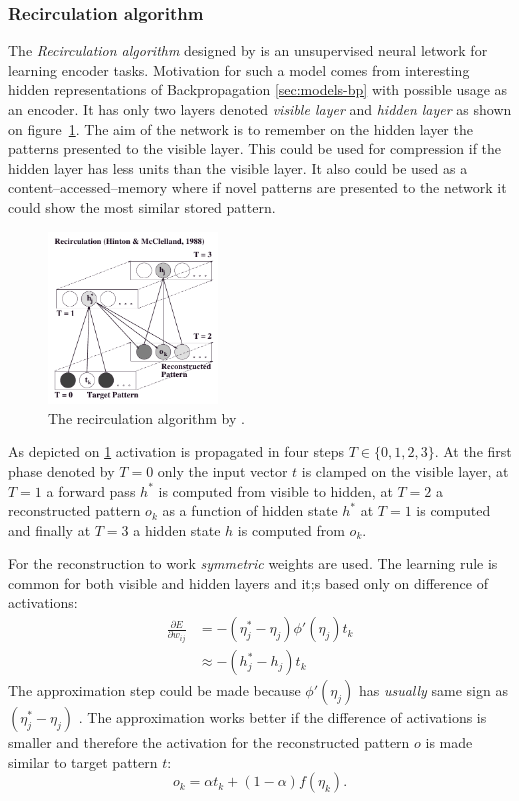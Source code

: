 \subsubsection{Recirculation algorithm}
\label{sec:models-recirc} 

The \emph{Recirculation algorithm} designed by \citet{hinton1988learning} is an unsupervised neural letwork for learning encoder tasks. Motivation for such a model comes from interesting hidden representations of Backpropagation \ref{sec:models-bp} with possible usage as an encoder. It has only two layers denoted \emph{visible layer} and \emph{hidden layer} as shown on figure~\ref{fig:models-recirc}. The aim of the network is to remember on the hidden layer the patterns presented to the visible layer. This could be used for compression if the hidden layer has less units than the visible layer. It also could be used as a content--accessed--memory where if novel patterns are presented to the network it could show the most similar stored pattern. 

\begin{figure}[H]
  \centering
\includegraphics[width=0.4\textwidth]{img/recirculation.png}
  \caption{The recirculation algorithm by \citet{hinton1988learning}. }
  \label{fig:models-recirc}
\end{figure}

As depicted on \ref{fig:models-recirc} activation is propagated in four steps $T \in \{0,1,2,3\}$. At the first phase denoted by $T=0$ only the input vector $t$ is clamped on the visible layer, at $T=1$ a forward pass $h^{*}$ is computed from visible to hidden, at $T=2$ a reconstructed pattern $o_k$ as a function of hidden state $h^{*}$ at $T=1$ is computed and finally at $T=3$ a hidden state $h$ is computed from $o_k$.

For the reconstruction to work \emph{symmetric} weights are used. The learning rule is common for both visible and hidden layers and it;s based only on difference of activations: 
\begin{align}
\frac{\partial E}{\partial w_{ij}} &= -(\eta^{*}_j - \eta_j) \phi'(\eta_j) t_k \nonumber \\
&\approx -(h^{*}_j - h_j)t_k \nonumber 
\end{align} 
The approximation step could be made because $\phi'(\eta_j)$ has \emph{usually} same sign as $(\eta^{*}_j - \eta_j) $ \citep{hinton1988learning, o1996bio}. The approximation works better if the difference of activations is smaller and therefore the activation for the reconstructed pattern $o$  is made similar to target pattern $t$: 
\begin{equation}
o_k = \alpha t_k + (1-\alpha)f(\eta_k). 
\end{equation} 

